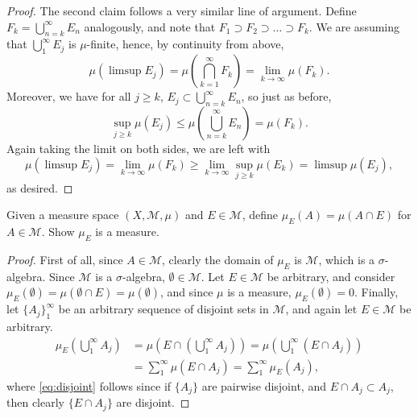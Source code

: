 \documentclass[12pt]{article}
\newenvironment{problem}[2][Problem]{\begin{trivlist}
    \item[\hskip \labelsep {\bfseries #1}\hskip \labelsep {\bfseries #2.}]}{\end{trivlist}}
\theoremstyle{definition}
\begin{document}
\begin{proof}
	The second claim follows a very similar line of argument.
	Define \( F_k = \bigcup_{n=k}^{\infty} E_{n}\) analogously, and note that \( F_1 \supset F_2 \supset \dots \supset F_k \).
	We are assuming that \( \bigcup_1^{\infty} E_j \) is \( \mu \)-finite, hence, by continuity from above,
	\begin{equation}
		\label{eq:6}
		\mu(\limsup E_{j}) = \mu(\bigcap_{k=1}^{\infty} F_k) = \lim_{k\rightarrow\infty} \mu(F_k).
	\end{equation}
	Moreover, we have for all \( j \geq k \), \( E_j \subset \bigcup_{n=k}^{\infty} E_n \), so just as before,
	\begin{equation}
		\label{eq:7}
		\sup_{j \geq k} \mu(E_j) \leq \mu(\bigcup_{n=k}^{\infty} E_n) = \mu(F_k).
	\end{equation}
	Again taking the limit on both sides, we are left with
	\begin{equation}
		\label{eq:8}
		\mu(\limsup E_j) = \lim_{k\rightarrow \infty} \mu(F_k) \geq \lim_{k\rightarrow \infty} \sup_{j \geq k} \mu(E_k) = \limsup \mu(E_j),
	\end{equation}
	as desired.
\end{proof}

\begin{problem}{1.3.10}
	Given a measure space \( (X, \mathcal{M}, \mu) \) and \( E \in \mathcal{M} \), define \(\mu_E(A) = \mu(A \cap E)\) for \( A \in \mathcal{M} \).
	Show \( \mu_E \) is a measure.
\end{problem}
\begin{proof}
	First of all, since \( A \in \mathcal{M} \), clearly the domain of \(\mu_E\) is \( \mathcal{M} \), which is a \(\sigma\)-algebra.
	Since \( \mathcal{M} \) is a \(\sigma\)-algebra, \( \emptyset \in \mathcal{M} \).
	Let \( E \in \mathcal{M} \) be arbitrary, and consider \(\mu_E(\emptyset) = \mu(\emptyset \cap E) = \mu(\emptyset)\), and since \( \mu \) is a measure, \(\mu_E(\emptyset) = 0\).
	Finally, let \( \{A_j\}_1^{\infty} \) be an arbitrary sequence of disjoint sets in \( \mathcal{M} \), and again let \( E \in \mathcal{M} \) be arbitrary.
	\begin{align}
		\mu_E(\bigcup_1^{\infty} A_j) & = \mu\left(E \cap (\bigcup_{1}^{\infty} A_j) \right) = \mu \left( \bigcup_1^{\infty} (E \cap A_{j}) \right) \\
		\label{eq:disjoint}           & = \sum\limits_1^{\infty} \mu(E \cap A_j) = \sum\limits_1^{\infty} \mu_E(A_j),
	\end{align}
	where \cref{eq:disjoint} follows since if \( \{A_j\} \) are pairwise disjoint, and \( E \cap A_j \subset A_j \), then clearly \( \{ E \cap A_{j }\} \) are disjoint.

\end{proof}
\end{document}
